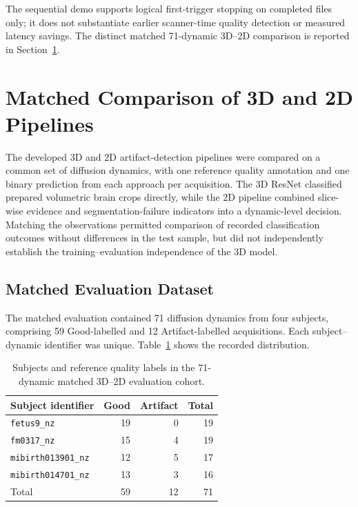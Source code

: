 The sequential demo supports logical first-trigger stopping on completed files only; it does not substantiate earlier scanner-time quality detection or measured latency savings. The distinct matched 71-dynamic 3D--2D comparison is reported in Section~\ref{sec:results_3d_vs_2d}.

\section{Matched Comparison of 3D and 2D Pipelines}
\label{sec:results_3d_vs_2d}

The developed 3D and 2D artifact-detection pipelines were compared on a common set of diffusion dynamics, with one reference quality annotation and one binary prediction from each approach per acquisition. The 3D ResNet classified prepared volumetric brain crops directly, while the 2D pipeline combined slice-wise evidence and segmentation-failure indicators into a dynamic-level decision. Matching the observations permitted comparison of recorded classification outcomes without differences in the test sample, but did not independently establish the training--evaluation independence of the 3D model.

\subsection{Matched Evaluation Dataset}
\label{subsec:results_matched_dynamic_cohort}

The matched evaluation contained 71 diffusion dynamics from four subjects, comprising 59 Good-labelled and 12 Artifact-labelled acquisitions. Each subject--dynamic identifier was unique. Table~\ref{tab:results_matched_subject_counts} shows the recorded distribution.

\begin{table}[htbp]
\centering
\caption{Subjects and reference quality labels in the 71-dynamic matched 3D--2D evaluation cohort.}
\label{tab:results_matched_subject_counts}
\begin{tabular}{lrrr}
\hline
Subject identifier & Good & Artifact & Total \\
\hline
\texttt{fetus9\_nz} & 19 & 0 & 19 \\
\texttt{fm0317\_nz} & 15 & 4 & 19 \\
\texttt{mibirth013901\_nz} & 12 & 5 & 17 \\
\texttt{mibirth014701\_nz} & 13 & 3 & 16 \\
\hline
Total & 59 & 12 & 71 \\
\hline
\end{tabular}
\end{table}


